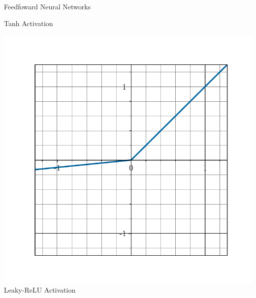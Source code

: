 \begin{frame}{Feedfoward Neural Networks}
\begin{overlayarea}{\textwidth}{4cm}
{\begin{minipage}{\textwidth}
\begin{minipage}{0.32\textwidth}
	  \tiny{Tanh Activation}
	\end{minipage}
	\hfill
	\begin{minipage}{0.31\textwidth}
	  \centering
	  \includegraphics[scale=0.15]{images/nonlinear_func/relu.pdf} \\
	  \tiny{Leaky-ReLU Activation}
	\end{minipage}
      \end{minipage}
    }
  \end{overlayarea}



\end{frame}



